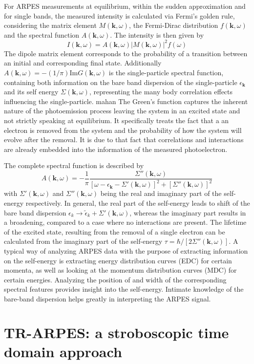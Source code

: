 For ARPES measurements at equilibrium, within the sudden approximation and for single bands, the measured intensity is calculated via Fermi's golden rule, considering the matrix element $M(\mathbf{k}, \omega)$, the Fermi-Dirac distribution $f(\mathbf{k}, \omega)$ and the spectral function $A(\mathbf{k}, \omega)$.
The intensity is then given by
\begin{equation}
	I(\mathbf{k}, \omega) = A(\mathbf{k}, \omega)\left|M(\mathbf{k}, \omega)\right|^2f(\omega)
\end{equation}
The dipole matrix element corresponds to the probability of a transition between an initial and corresponding final state.
Additionally $A(\mathbf{k}, \omega)=-(1/\pi)\text{Im}G(\mathbf{k}, \omega)$ is the single-particle spectral function, containing both information on the bare band dispersion of the single-particle $\epsilon_\mathbf{k}$ and its self energy $\Sigma(\mathbf{k}, \omega)$, representing the many body correlation effects influencing the single-particle. \cite{} mahan
The Green's function captures the inherent nature of the photoemission process leaving the system in an excited state and not strictly speaking at equilibrium.
It specifically treats the fact that a an electron is removed from the system and the probability of how the system will evolve after the removal.
It is due to that fact that correlations and interactions are already embedded into the information of the measured photoelectron.

The complete spectral function is described by
\begin{equation}
	A(\mathbf{k}, \omega)= -\frac{1}{\pi} \frac{\Sigma''(\mathbf{k}, \omega)}{\left[ \omega - \epsilon_\mathbf{k} - \Sigma'(\mathbf{k}, \omega) \right]^2 + \left[ \Sigma''(\mathbf{k}, \omega) \right]^2}
\end{equation}
with $\Sigma'(\mathbf{k}, \omega)$ and $\Sigma''(\mathbf{k}, \omega)$ being the real and imaginary part of the self-energy respectively.
In general, the real part of the self-energy leads to shift of the bare band dispersion $\epsilon_k \rightarrow \tilde{\epsilon}_k + \Sigma'(\mathbf{k}, \omega)$, whereas the imaginary part results in a broadening, compared to a case where no interactions are present.
The lifetime of the excited state, resulting from the removal of a single electron can be calculated from the imaginary part of the self-energy $\tau=\hbar/\left[2\Sigma''(\mathbf{k}, \omega)\right]$.
A typical way of analyzing ARPES data with the purpose of extracting information on the self-energy is extracting energy distribution curves (EDC) for certain momenta, as well as looking at the momentum distribution curves (MDC) for certain energies.
Analyzing the position of and width of the corresponding spectral features provides insight into the self-energy.
Intimate knowledge of the bare-band dispersion helps greatly in interpreting the ARPES signal.

\section{TR-ARPES: a stroboscopic time domain approach}

